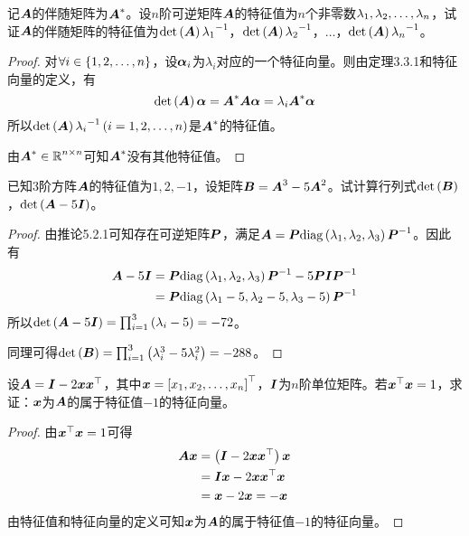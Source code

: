 \begin{problem}
记\(\mata\)的伴随矩阵为\(\mata^*\)。设\(n\)阶可逆矩阵\(\mata\)的特征值为\(n\)个非零数\(\enums{\lambda}{n}\)，试证\(\mata\)的伴随矩阵的特征值为\(\det{\mata}\inv{\lambda_1}\)，\(\det{\mata}\inv{\lambda_2}\)，\(\dots\)，\(\det{\mata}\inv{\lambda_n}\)。
\end{problem}
\begin{proof}
    对\(\forall i\in\setof{1,2,\dots,n}\)，设\(\vecal_i\)为\(\lambda_i\)对应的一个特征向量。则由定理3.3.1和特征向量的定义，有
    \begin{equation*}
        \det{\mata}\vecal=\mata^*\mata\vecal=\lambda_i\mata^*\vecal
    \end{equation*}
    所以\(\det{\mata}\inv{\lambda_i}\spar{i=1,2,\dots,n}\)是\(\mata^*\)的特征值。

    由\(\mata^*\in\rea^{n\times n}\)可知\(\mata^*\)没有其他特征值。
\end{proof}

\begin{problem}
已知\(3\)阶方阵\(\mata\)的特征值为\(1,2,-1\)，设矩阵\(\matb=\mata^3-5\mata^2\)。试计算行列式\(\det{\matb}\)，\(\det{\mata-5\mati}\)。
\end{problem}
\begin{proof}
    由推论5.2.1可知存在可逆矩阵\(\matp\)，满足\(\mata=\matp\diag{\lambda_1,\lambda_2,\lambda_3}\inv{\matp}\)。因此有
    \begin{align*}
        \mata-5\mati & =\matp\diag{\lambda_1,\lambda_2,\lambda_3}\inv{\matp}-5\matp\mati\inv{\matp} \\
                     & =\matp\diag{\lambda_1-5,\lambda_2-5,\lambda_3-5}\inv{\matp}
    \end{align*}
    所以\(\det{\mata-5\mati}=\prod_{i=1}^3\spar{\lambda_i-5}=-72\)。

    同理可得\(\det{\matb}=\prod_{i=1}^3\spar{\lambda_i^3-5\lambda_i^2}=-288\)。
\end{proof}

\begin{problem}
设\(\mata=\mati-2\vecx\vecx^\top\)，其中\(\vecx=\myvec{\enums{x}{n}}\)，\(\mati\)为\(n\)阶单位矩阵。若\(\vecx^\top\vecx=1\)，求证：\(\vecx\)为\(\mata\)的属于特征值\(-1\)的特征向量。
\end{problem}
\begin{proof}
    由\(\vecx^\top\vecx=1\)可得
    \begin{align*}
        \mata\vecx & =\spar{\mati-2\vecx\vecx^\top}\vecx \\
                   & =\mati\vecx-2\vecx\vecx^\top\vecx   \\
                   & =\vecx-2\vecx=-\vecx
    \end{align*}
    由特征值和特征向量的定义可知\(\vecx\)为\(\mata\)的属于特征值\(-1\)的特征向量。
\end{proof}

